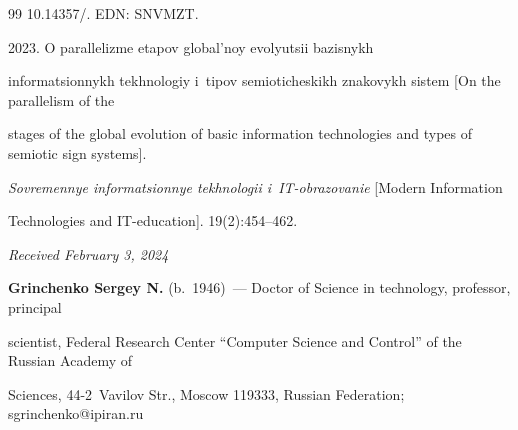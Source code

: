{{\begin{thebibliography}{99}
10.14357\!/. EDN: SNVMZT.




 2023. O parallelizme etapov global'noy evolyutsii bazisnykh 


informatsionnykh tekhnologiy i~tipov semioticheskikh znakovykh sis\-tem [On the parallelism of the 


stages of the global evolution of basic information technologies and types of semiotic sign systems]. 


\textit{Sovremennye informatsionnye tekhnologii i~IT-obrazovanie} [Modern Information 


Technologies and IT-education]. 19(2):454--462.








\end{thebibliography}


} }





\vspace*{-6pt}





\hfill{\small\textit{Received February 3, 2024}} 





\vspace*{-14pt} 





\Contrl





\vspace*{-3pt}





\noindent


\textbf{Grinchenko Sergey N.} (b.\ 1946)~--- Doctor of Science in technology, professor, principal 


scientist, Federal Research Center ``Computer Science and Control'' of the Russian Academy of 


Sciences, 44-2~Vavilov Str., Moscow 119333, Russian Federation; \mbox{sgrinchenko@ipiran.ru}








  


\label{end\stat}





\renewcommand{\bibname}{\protect\rm Литература} 


